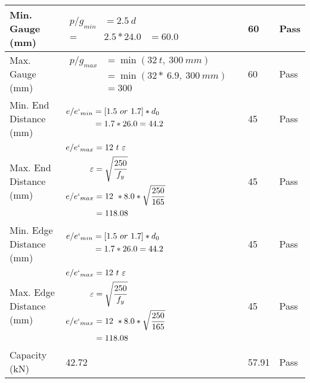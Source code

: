 \documentclass{article}%
\begin{document}
\begin{longtable}{|p{4cm}|p{5cm}|p{5.5cm}|p{1.5cm}|}
\hline%
Min. Gauge (mm)&$\begin{aligned}p/g_{min}&= 2.5 ~ d&\\ =&2.5*24.0&=60.0\end{aligned}$&60&Pass\\%
\hline%
Max. Gauge (mm)&$\begin{aligned}p/g_{max} &=\min(32~t,~300~mm)&\\ &=\min(32 *~6.9,~ 300 ~mm)\\&=300\end{aligned}$&60&Pass\\%
\hline%
Min. End Distance (mm)&$\begin{aligned}e/e`_{min} &=[1.5~or~ 1.7] * d_0\\ &=1.7*26.0=44.2 \end{aligned}$&45&Pass\\%
\hline%
Max. End Distance (mm)&$\begin{aligned}e/e`_{max} &= 12~ t~ \varepsilon&\\ \varepsilon &= \sqrt{\frac{250}{f_y}}\\ e/e`_{max}&=12 ~*8.0*\sqrt{\frac{250}{165}}\\ &=118.08\\ \end{aligned}$&45&Pass\\%
\hline%
Min. Edge Distance (mm)&$\begin{aligned}e/e`_{min} &=[1.5~or~ 1.7] * d_0\\ &=1.7*26.0=44.2 \end{aligned}$&45&Pass\\%
\hline%
Max. Edge Distance (mm)&$\begin{aligned}e/e`_{max} &= 12~ t~ \varepsilon&\\ \varepsilon &= \sqrt{\frac{250}{f_y}}\\ e/e`_{max}&=12 ~*8.0*\sqrt{\frac{250}{165}}\\ &=118.08\\ \end{aligned}$&45&Pass\\%
\hline%
Capacity (kN)&42.72&57.91&Pass\\%
\hline%
\end{longtable}

%
\newpage%
\end{document}
